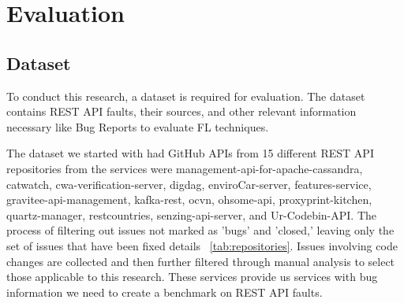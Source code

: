 \documentclass[conference]{IEEEtran}
\begin{document}




\section{Evaluation}
\label{sec:evaluation}



\subsection{Dataset}
\label{sec:dataset}

To conduct this research, a dataset is required for evaluation. The dataset contains REST API faults, their sources, and other relevant information necessary like Bug Reports to evaluate FL techniques.

The dataset we started with had  GitHub APIs from 15 different REST API repositories from the services were management-api-for-apache-cassandra, catwatch, cwa-verification-server, digdag, enviroCar-server, features-service,
gravitee-api-management, kafka-rest, ocvn, ohsome-api, proxyprint-kitchen, quartz-manager, restcountries, senzing-api-server, and Ur-Codebin-API.
The  process of filtering out issues not marked as 'bugs' and 'closed,' leaving only the set of issues that have been fixed details ~\ref{tab:repositories}. Issues involving code changes are collected and then further filtered through manual analysis to select those applicable to this research. These services provide us services with bug information we need to create a benchmark on REST API faults.
\end{document}
